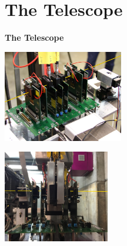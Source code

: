 \documentclass[9pt]{beamer}
\begin{document}
\section{The Telescope}
\begin{frame}
	\begin{alertblock}{
		\begin{center}
			\Large{\textbf{The Telescope}}
		\end{center}}
	\end{alertblock}
	\begin{center}
		\begin{minipage}{5.5cm}
			\centering
			\includegraphics[height=4cm]{Pics/telescope2}
		\end{minipage}
		\hspace*{2pt}
		\begin{minipage}{5.5cm}
			\centering
			\includegraphics[height=4cm]{Pics/telescope3}
		\end{minipage}
	\end{center}
\end{frame}
\end{document}
